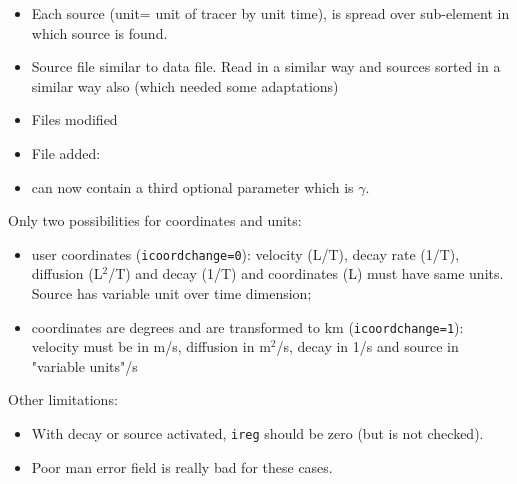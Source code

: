 \begin{itemize}
\item
Each source (unit= unit of tracer by unit time), is spread over sub-element in which source is found.
\item
Source file  similar to data file. Read in a similar way and sources sorted in a similar way also (which needed some adaptations)
\item Files modified
 
\item File added: 
\item {} can now contain a third optional parameter which is $\gamma$.
\end{itemize}

Only two possibilities for coordinates and units:
\begin{itemize}
\item user coordinates ({\tt icoordchange=0}): velocity (L/T), decay rate (1/T), diffusion (L$^2$/T) and decay (1/T) and coordinates (L) must have same units. Source has variable unit over time dimension;
\item coordinates are degrees and are transformed to km ({\tt icoordchange=1}): velocity must be in m/s, diffusion in m$^2$/s, decay in 1/s and source in "variable units"/s
\end{itemize}
Other limitations: 
\begin{itemize}
\item
With decay or source activated, {\tt ireg} should be zero (but is not checked).
\item
Poor man error field is really bad for these cases.
\end{itemize}

%
%



